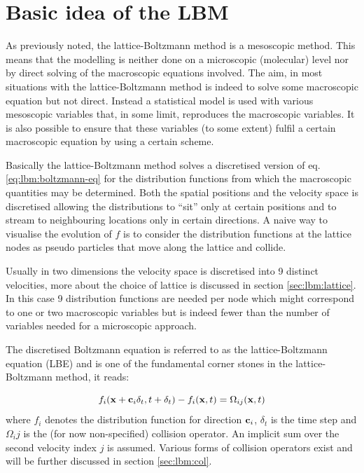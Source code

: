 \section{Basic idea of the LBM}
As previously noted, the lattice-Boltzmann method is a mesoscopic
method. This means that the modelling is neither done on a microscopic
(molecular) level nor by direct solving of the macroscopic equations
involved. The aim, in most situations with the lattice-Boltzmann
method is indeed to solve some macroscopic equation but not
direct. Instead a statistical model is used with various mesoscopic
variables that, in some limit, reproduces the macroscopic
variables. It is also possible to ensure that these variables (to some
extent) fulfil a certain macroscopic equation by using a certain
scheme.

Basically the lattice-Boltzmann method solves a discretised version of
eq. \eqref{eq:lbm:boltzmann-eq} for the distribution functions from
which the macroscopic quantities may be determined. Both the spatial
positions and the velocity space is discretised allowing the
distributions to ``sit'' only at certain positions and to stream to
neighbouring locations only in certain directions. A naive way to
visualise the evolution of $f$ is to consider the distribution
functions at the lattice nodes as pseudo particles that move along the
lattice and collide.

Usually in two dimensions the velocity space is discretised into 9
distinct velocities, more about the choice of lattice is discussed in
section \ref{sec:lbm:lattice}. In this case 9 distribution functions
are needed per node which might correspond to one or two macroscopic
variables but is indeed fewer than the number of variables needed for
a microscopic approach.

The discretised Boltzmann equation is referred to as the
lattice-Boltzmann equation (LBE) and is one of the fundamental corner
stones in the lattice-Boltzmann method, it reads:

\begin{equation}\label{eq:lbm:lbe}
f_i(\mathbf{x} + \mathbf{c}_i\delta_t, t + \delta_t) - f_i(\mathbf{x}, t) = \Omega_{ij}(\mathbf{x}, t)
\end{equation}
where $f_i$ denotes the distribution function for direction $\mathbf{c}_i$,
$\delta_t$ is the time step and $\Omega_ij$ is the (for now
non-specified) collision operator. An implicit sum over the second
velocity index $j$ is assumed. Various forms of collision operators
exist and will be further discussed in section \ref{sec:lbm:col}.

